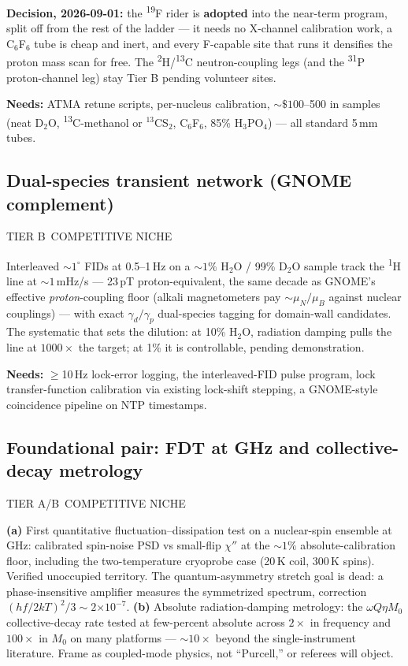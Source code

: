 \documentclass[11pt]{article}
\newcommand{\chip}[3]{\colorbox{#1}{\textcolor{#2}{\scriptsize\textsf{\vphantom{Ag}#3}}}}
\newcommand{\cniche}[1]{\chip{accentsoft}{accentink}{#1}}
\newcommand{\ctier}[1]{\chip{numbg}{inkfaint}{#1}}
\newcommand{\needs}[1]{{\small\textcolor{inkfaint}{\textbf{Needs:} #1}}}
\newcommand{\hnmr}{\textsuperscript{1}H}
\newcommand{\dnmr}{\textsuperscript{2}H}
\newcommand{\fnmr}{\textsuperscript{19}F}
\newcommand{\cnmr}{\textsuperscript{13}C}
\newcommand{\pnmr}{\textsuperscript{31}P}
\newcommand{\e}[1]{\ensuremath{\times10^{#1}}}
\begin{document}
\noindent\textbf{Decision, 2026-09-01:} the \fnmr{} rider is \textbf{adopted}
into the near-term program, split off from the rest of the ladder --- it needs
no X-channel calibration work, a C$_6$F$_6$ tube is cheap and inert, and every
F-capable site that runs it densifies the proton mass scan for free. The \dnmr/\cnmr{} neutron-coupling legs (and the \pnmr{}
proton-channel leg) stay Tier B pending volunteer sites.

\smallskip
\needs{ATMA retune scripts, per-nucleus calibration, ${\sim}\$100$--500 in
samples (neat D$_2$O, \cnmr-methanol or $^{13}$CS$_2$, C$_6$F$_6$, 85\%
H$_3$PO$_4$) --- all standard 5\,mm tubes.}

\subsection{Dual-species transient network (GNOME complement)}
\ctier{TIER B}\ \cniche{COMPETITIVE NICHE}

\medskip\noindent
Interleaved ${\sim}1^\circ$ FIDs at 0.5--1\,Hz on a ${\sim}1\%$ H$_2$O / 99\%
D$_2$O sample track the \hnmr{} line at ${\sim}1$\,mHz/s --- 23\,pT
proton-equivalent, the same decade as GNOME's effective \emph{proton}-coupling
floor (alkali magnetometers pay ${\sim}\mu_N/\mu_B$ against nuclear couplings)
--- with exact $\gamma_d/\gamma_p$ dual-species tagging for domain-wall
candidates. The systematic that sets the dilution: at 10\% H$_2$O, radiation
damping pulls the line at $1000\times$ the target; at 1\% it is controllable,
pending demonstration.

\smallskip
\needs{$\geq$10\,Hz lock-error logging, the interleaved-FID pulse program, lock
transfer-function calibration via existing lock-shift stepping, a GNOME-style
coincidence pipeline on NTP timestamps.}

\subsection{Foundational pair: FDT at GHz and collective-decay metrology}
\ctier{TIER A/B}\ \cniche{COMPETITIVE NICHE}

\medskip\noindent
\textbf{(a)} First quantitative fluctuation--dissipation test on a nuclear-spin
ensemble at GHz: calibrated spin-noise PSD vs small-flip $\chi''$ at the
${\sim}1\%$ absolute-calibration floor, including the two-temperature cryoprobe
case (20\,K coil, 300\,K spins). Verified unoccupied territory. The
quantum-asymmetry stretch goal is dead: a phase-insensitive amplifier measures
the symmetrized spectrum, correction $(hf/2kT)^2/3\sim2\e{-7}$.
\textbf{(b)} Absolute radiation-damping metrology: the $\omega Q\eta M_0$
collective-decay rate tested at few-percent absolute across $2\times$ in
frequency and $100\times$ in $M_0$ on many platforms --- ${\sim}10\times$ beyond
the single-instrument literature. Frame as coupled-mode physics, not
``Purcell,'' or referees will object.
\end{document}
